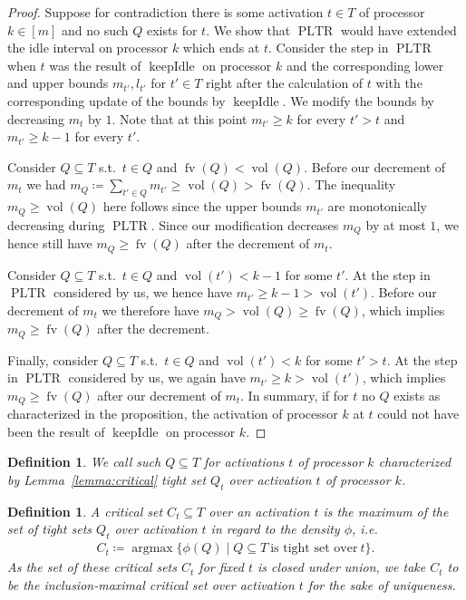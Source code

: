 \documentclass[a4paper]{article}
\DeclareMathOperator{\argmax}{argmax}
\DeclareMathOperator{\PLTR}{PLTR}
\DeclareMathOperator{\fv}{fv}
\DeclareMathOperator{\vol}{vol}
\DeclareMathOperator{\keepidle}{keepIdle}
\newtheorem{definition}[theorem]{Definition}
\begin{document}
\begin{proof}
  Suppose for contradiction there is some activation $t \in T$ of processor $k \in [m]$ and no such $Q$ exists for $t$.
  We show that $\PLTR$ would have extended the idle interval on processor $k$ which ends at $t$.
  Consider the step in $\PLTR$ when $t$ was the result of $\keepidle$ on processor $k$ and the corresponding lower and upper bounds $m_{t'}, l_{t'}$ for $t' \in T$ right after the calculation of $t$ with the corresponding update of the bounds by $\keepidle$.
  We modify the bounds by decreasing $m_t$ by $1$.
  Note that at this point $m_{t'} \geq k$ for every $t' > t$ and $m_{t'} \geq k - 1$ for every $t'$.

  Consider $Q \subseteq T$ s.t.\ $t \in Q$ and $\fv(Q) < \vol(Q)$.
  Before our decrement of $m_t$ we had $m_Q \coloneqq \sum_{t' \in Q} m_{t'} \geq \vol(Q) > \fv(Q)$.
  The inequality $m_Q \geq \vol(Q)$ here follows since the upper bounds $m_{t'}$ are monotonically decreasing during $\PLTR$.
  Since our modification decreases $m_Q$ by at most $1$, we hence still have $m_Q \geq \fv(Q)$ after the decrement of $m_t$.

  Consider $Q \subseteq T$ s.t.\ $t \in Q$ and $\vol(t') < k - 1$ for some $t'$.
  At the step in $\PLTR$ considered by us, we hence have $m_{t'} \geq k - 1 > \vol(t')$.
  Before our decrement of $m_t$ we therefore have $m_Q > \vol(Q) \geq \fv(Q)$, which implies $m_Q \geq \fv(Q)$ after the decrement.

  Finally, consider $Q \subseteq T$ s.t.\ $t \in Q$ and $\vol(t') < k$ for some $t' > t$.
  At the step in $\PLTR$ considered by us, we again have $m_{t'} \geq k > \vol(t')$, which implies $m_Q \geq \fv(Q)$ after our decrement of $m_t$.
  In summary, if for $t$ no $Q$ exists as characterized in the proposition, the activation of processor $k$ at $t$ could not have been the result of $\keepidle$ on processor $k$.
\end{proof}

\begin{definition}
  We call such $Q \subseteq T$ for activations $t$ of processor $k$ characterized by Lemma~\ref{lemma:critical} \emph{tight set $Q_t$ over activation $t$ of processor $k$}.
\end{definition}

\begin{definition}
  A \emph{critical set $C_t \subseteq T$ over an activation $t$} is the maximum of the set of tight sets $Q_t$ over activation $t$ in regard to the density $\phi$, i.e.
  \begin{align}
    C_t \coloneqq \argmax \{ \phi(Q) \mid Q \subseteq T~\text{is tight set over}~t \} \text{.}
  \end{align}
  As the set of these critical sets $C_t$ for fixed $t$ is closed under union, we take $C_t$ to be the inclusion-maximal critical set over activation $t$ for the sake of uniqueness.
\end{definition}
\end{document}
